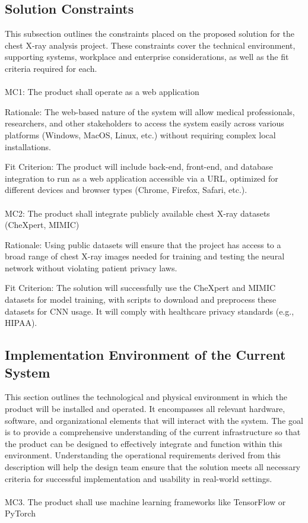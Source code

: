 \documentclass[12pt]{article}
\begin{document}
\subsection{Solution Constraints}
This subsection outlines the constraints placed on the proposed solution for the chest X-ray 
analysis project. These constraints cover the technical environment, supporting systems, workplace 
and enterprise considerations, as well as the fit criteria required for each.
\\\\
\indent
MC1: The product shall operate as a web application

Rationale: The web-based nature of the system will allow medical professionals, researchers, and 
other stakeholders to access the system easily across various platforms (Windows, MacOS, Linux, 
etc.) without requiring complex local installations.

Fit Criterion: The product will include back-end, front-end, and database integration to run as a 
web application accessible via a URL, optimized for different devices and browser types (Chrome, 
Firefox, Safari, etc.).
\\\\
\indent
MC2: The product shall integrate publicly available chest X-ray datasets (CheXpert, MIMIC)

Rationale: Using public datasets will ensure that the project has access to a broad range of chest 
X-ray images needed for training and testing the neural network without violating patient privacy 
laws.

Fit Criterion: The solution will successfully use the CheXpert and MIMIC datasets for model 
training, with scripts to download and preprocess these datasets for CNN usage. It will comply 
with healthcare privacy standards (e.g., HIPAA).

\subsection{Implementation Environment of the Current System}
This section outlines the technological and physical environment in which the product will be 
installed and operated. It encompasses all relevant hardware, software, and organizational 
elements that will interact with the system. The goal is to provide a comprehensive understanding 
of the current infrastructure so that the product can be designed to effectively integrate and 
function within this environment. Understanding the operational requirements derived from this 
description will help the design team ensure that the solution meets all necessary criteria for 
successful implementation and usability in real-world settings.
\\\\
\noindent
MC3. The product shall use machine learning frameworks like TensorFlow or PyTorch
\end{document}
